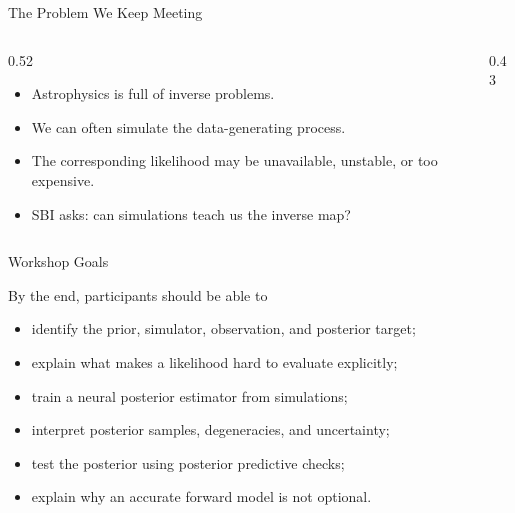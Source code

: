 \documentclass[aspectratio=169,11pt]{beamer}
\newcommand{\tightlist}{\setlength{\itemsep}{0.35em}}
\begin{document}
\begin{frame}{The Problem We Keep Meeting}
  \begin{columns}[T,onlytextwidth]
    \begin{column}{0.52\textwidth}
      \begin{itemize}\tightlist
        \item Astrophysics is full of inverse problems.
        \item We can often simulate the data-generating process.
        \item The corresponding likelihood may be unavailable, unstable, or too expensive.
        \item SBI asks: can simulations teach us the inverse map?
      \end{itemize}
    \end{column}
    \begin{column}{0.43\textwidth}
    \end{column}
  \end{columns}
\end{frame}

\begin{frame}{Workshop Goals}
  \begin{block}{By the end, participants should be able to}
    \begin{itemize}\tightlist
      \item identify the prior, simulator, observation, and posterior target;
      \item explain what makes a likelihood hard to evaluate explicitly;
      \item train a neural posterior estimator from simulations;
      \item interpret posterior samples, degeneracies, and uncertainty;
      \item test the posterior using posterior predictive checks;
      \item explain why an accurate forward model is not optional.
    \end{itemize}
  \end{block}
\end{frame}
\end{document}
